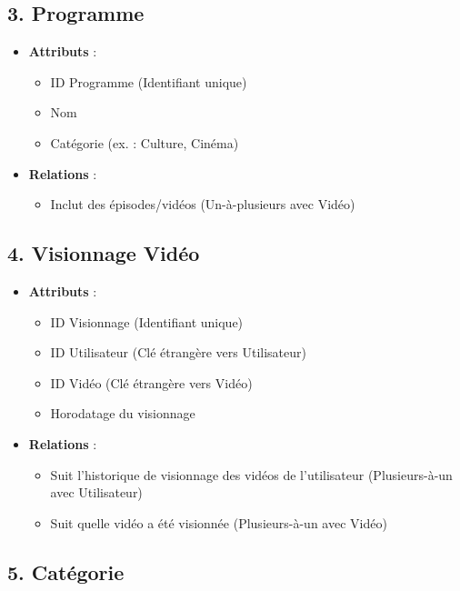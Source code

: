 \documentclass[a4paper, 12pt]{article}
\begin{document}
\subsection*{3. Programme}

\begin{itemize}
    \item \textbf{Attributs} :
    \begin{itemize}
        \item ID Programme (Identifiant unique)
        \item Nom
        \item Catégorie (ex. : Culture, Cinéma)
    \end{itemize}
    \item \textbf{Relations} :
    \begin{itemize}
        \item Inclut des épisodes/vidéos (Un-à-plusieurs avec Vidéo)
    \end{itemize}
\end{itemize}

\subsection*{4. Visionnage Vidéo}

\begin{itemize}
    \item \textbf{Attributs} :
    \begin{itemize}
        \item ID Visionnage (Identifiant unique)
        \item ID Utilisateur (Clé étrangère vers Utilisateur)
        \item ID Vidéo (Clé étrangère vers Vidéo)
        \item Horodatage du visionnage
    \end{itemize}
    \item \textbf{Relations} :
    \begin{itemize}
        \item Suit l'historique de visionnage des vidéos de l'utilisateur (Plusieurs-à-un avec Utilisateur)
        \item Suit quelle vidéo a été visionnée (Plusieurs-à-un avec Vidéo)
    \end{itemize}
\end{itemize}

\subsection*{5. Catégorie}
\end{document}
